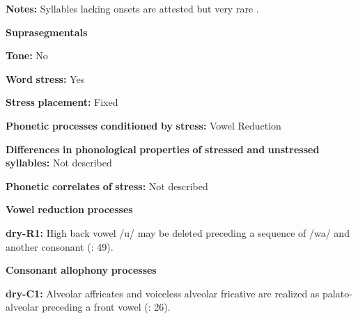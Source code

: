 \documentclass[output=paper]{langsci/langscibook}
\begin{document}
\begin{styleBody}
\textbf{Notes:} Syllables lacking onsets are attested but very rare \citep[19]{Dhakal2012}.
\end{styleBody}

\begin{styleBody}
\textbf{Suprasegmentals}
\end{styleBody}

\begin{styleBody}
\textbf{Tone:} No
\end{styleBody}

\begin{styleBody}
\textbf{Word} \textbf{stress:} Yes
\end{styleBody}

\begin{styleBody}
\textbf{Stress} \textbf{placement:} Fixed
\end{styleBody}

\begin{styleBody}
\textbf{Phonetic} \textbf{processes} \textbf{conditioned} \textbf{by} \textbf{stress:} Vowel Reduction
\end{styleBody}

\begin{styleBody}
\textbf{Differences} \textbf{in} \textbf{phonological} \textbf{properties} \textbf{of} \textbf{stressed} \textbf{and} \textbf{unstressed} \textbf{syllables:} Not described
\end{styleBody}

\begin{styleBody}
\textbf{Phonetic} \textbf{correlates} \textbf{of} \textbf{stress:} Not described
\end{styleBody}

\begin{styleBody}
\textbf{Vowel} \textbf{reduction} \textbf{processes}
\end{styleBody}

\begin{styleBody}
\textbf{dry-R1:} High back vowel /u/ may be deleted preceding a sequence of /wa/ and another consonant (\citealt{KotapishKotapish1973}: 49).
\end{styleBody}

\begin{styleBody}
\textbf{Consonant} \textbf{allophony} \textbf{processes}
\end{styleBody}

\begin{styleBody}
\textbf{dry-C1:} Alveolar affricates and voiceless alveolar fricative are realized as palato-alveolar preceding a front vowel (\citealt{KotapishKotapish1978}: 26).
\end{styleBody}
\end{document}
